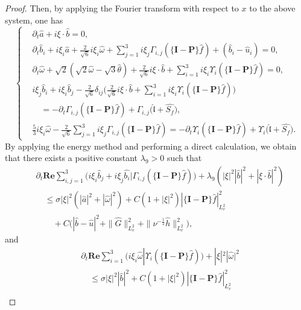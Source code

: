 \documentclass[reqno,11pt]{amsart}
\theoremstyle{plain}
\numberwithin{equation}{section}
\begin{document}
\begin{proof}
Then,  by applying the  Fourier transform with respect to $x$ to the above system, one has
\begin{equation*} \left\{
\begin{aligned}
& \partial_t \hat{a}+i \xi \cdot \hat{b}=0, \\
& \partial_t \hat{b}_i+i \xi_i \hat{a}+\frac{2}{\sqrt{6}} i \xi_i \hat{\omega}+\sum_{j=1}^3 i \xi_j \Gamma_{i, j}(\{\mathbf{I}-\mathbf{P}\} \hat{f})+(\hat{b}_i-\hat{u}_i)=0, \\
& \partial_t \hat{\omega}+\sqrt{2}(\sqrt{2} \hat{\omega}-\sqrt{3} \hat{\theta})+\frac{2}{\sqrt{6}} i \xi \cdot \hat{b}+\sum_{i=1}^3 i \xi_i \Upsilon_i(\{\mathbf{I}-\mathbf{P}\} \hat{f})=0, \\
& i \xi_j \hat{b}_i+i \xi_i \hat{b}_j-\frac{2}{\sqrt{6}} \delta_{i j}\Big(\frac{2}{\sqrt{6}} i \xi \cdot \hat{b}+\sum_{i=1}^3 i \xi_i \Upsilon_i(\{\mathbf{I}-\mathbf{P}\} \hat{f})\Big)\\
&\quad =-\partial_t \Gamma_{i, j}(\{\mathbf{I}-\mathbf{P}\} \hat{f})+\Gamma_{i, j}\big(\hat{\mathfrak{l}}+\hat{ {S}_f}\big), \\
& \frac{5}{3} i \xi_i \hat{\omega}-\frac{2}{\sqrt{6}} \sum_{j=1}^3 i \xi_j 
\Gamma_{i, j}(\{\mathbf{I}-\mathbf{P}\} \hat{f})=-\partial_t \Upsilon_i(\{\mathbf{I}-\mathbf{P}\} \hat{f})
+\Upsilon_i\big(\hat{\mathfrak{l}}+\hat{{S}_f}\big) .
\end{aligned}\right.
\end{equation*}
By applying the energy method and performing a direct calculation, we obtain that there exists a positive constant $\lambda_{9} > 0$ such that 
\begin{align}\label{G5.12}
& \partial_t \mathbf{Re} \sum_{i, j=1}^3\big( i \xi_i \hat{b}_j+i \xi_j \hat{b_i} 
| \Gamma_{i, j}(\{\mathbf{I}-\mathbf{P}\} \hat{f})\big)
+\lambda_{9} (|\xi|^2|\hat{b}|^2+|\xi \cdot \hat{b}|^2 ) \nonumber\\
&\quad\leq \sigma|\xi|^2 (|\hat{a}|^2+|\hat{\omega}|^2 )+C (1+|\xi|^2 )|\{\mathbf{I}-\mathbf{P}\} \hat{f}|_{L_v^2}^2\nonumber\\
&\qquad+C\big(|\hat{b}-\hat{u}|^2+\|\hat{G}\|_{L_v^2}^2+\|\nu^{-\frac{1}{2}} \hat{h}\|_{L_v^2}^2\big),
\end{align}
and
\begin{align}\label{G5.13}
& \partial_t \mathbf{Re} \sum_{i=1}^3\big( i \xi_i \hat{\omega} 
| \Upsilon_i(\{\mathbf{I}-\mathbf{P}\} \hat{f})\big)+|\xi|^2|\hat{\omega}|^2  \nonumber\\
&\quad\leq \sigma|\xi|^2|\hat{b}|^2+C (1+|\xi|^2)|\{\mathbf{I}-\mathbf{P}\} \hat{f}|_{L_v^2}^2\nonumber\\

\end{align}
\end{proof}
\end{document}
